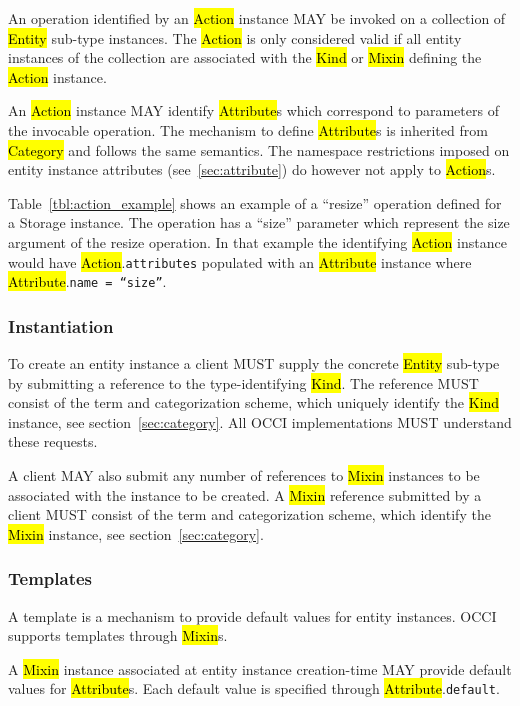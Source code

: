 \documentclass[10pt,a4paper]{article}
\begin{document}
An operation identified by an \hl{Action} instance MAY be invoked on a
collection of \hl{Entity} sub-type
instances. The \hl{Action} is only considered valid if all entity
instances of the collection are associated with the \hl{Kind} or
\hl{Mixin} defining the \hl{Action} instance.

An \hl{Action} instance MAY identify \hl{Attribute}s which correspond to
parameters of the invocable operation.
The mechanism to define \hl{Attribute}s is inherited from \hl{Category}
and follows the same semantics.
The namespace restrictions imposed on entity instance attributes
(see~\ref{sec:attribute}) do however not apply to \hl{Action}s.

Table~\ref{tbl:action_example} shows an example of a ``resize'' operation
defined for a Storage
instance. The operation has a ``size'' parameter which represent the size
argument of the resize operation. In that example the identifying
\hl{Action} instance would have \hl{Action}.{\tt attributes} populated
with an \hl{Attribute} instance where \hl{Attribute}.{\tt name = ``size''}.


\subsubsection{Instantiation}
\label{sec:instantiation}
To create an entity instance a client MUST supply the concrete
\hl{Entity} sub-type by submitting a reference to the
type-identifying \hl{Kind}.  The reference MUST consist of the term
and categorization scheme, which uniquely identify the \hl{Kind}
instance, see section~\ref{sec:category}.  All OCCI implementations
MUST understand these requests.

A client MAY also submit any number of references to \hl{Mixin}
instances to be associated with the instance to be created. A
\hl{Mixin} reference submitted by a client MUST consist of the term
and categorization scheme, which identify the \hl{Mixin} instance, see
section~\ref{sec:category}.

\subsubsection{Templates}
\label{sec:template}

A template is a mechanism to provide default values for entity instances.
OCCI supports templates through \hl{Mixin}s.

A \hl{Mixin} instance associated at entity instance creation-time MAY provide default
values for \hl{Attribute}s.
Each default value is specified through \hl{Attribute}.{\tt default}.
\end{document}

